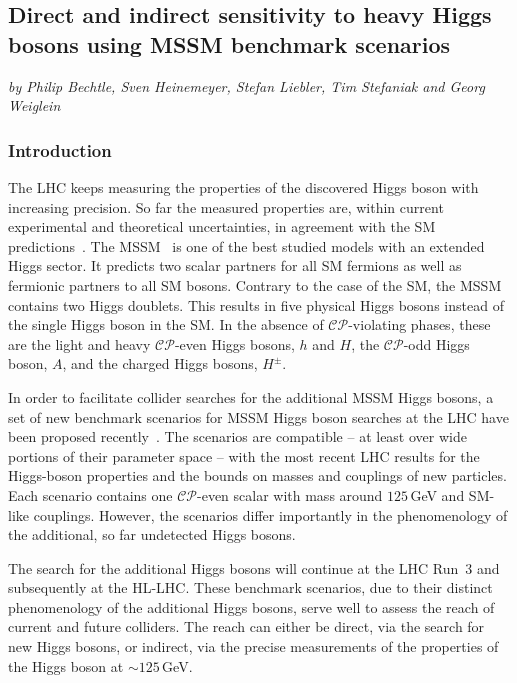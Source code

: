 \subsection{Direct and indirect sensitivity to heavy Higgs bosons using MSSM benchmark scenarios}\label{Sec:9.5}
\begin{center}
\textit{by Philip Bechtle, Sven Heinemeyer, Stefan Liebler, Tim Stefaniak and Georg Weiglein}
\end{center}

\subsubsection{Introduction}

The LHC keeps measuring the properties of the discovered Higgs boson with increasing precision. So far the measured properties are, within current experimental and theoretical uncertainties, in agreement with the SM predictions~\cite{Khachatryan:2016vau}. The MSSM~\cite{Nilles:1983ge,Haber:1984rc,Gunion:1984yn} is one of the best studied models with an extended Higgs sector. It predicts two scalar partners for all SM fermions as well as fermionic partners to all SM bosons. Contrary to the case of the SM, the MSSM contains two Higgs doublets.
This results in five physical Higgs bosons instead of the single Higgs boson in the SM. In the absence of $\mathcal{CP}$-violating phases, these are the light and heavy $\mathcal{CP}$-even Higgs bosons,  
$h$ and $H$, the $\mathcal{CP}$-odd Higgs boson, $A$, and the charged Higgs bosons, $H^\pm$.

In order to facilitate collider searches for the additional MSSM Higgs bosons, a set of new benchmark scenarios for MSSM Higgs boson searches at the LHC have been proposed recently~\cite{Bahl:2018zmf}. The scenarios are compatible -- at least over wide portions
of their parameter space -- with the most recent LHC results for the
Higgs-boson properties and the bounds on masses and couplings of new
particles. Each scenario contains one $\mathcal{CP}$-even scalar with mass around $125$\,GeV and SM-like couplings. However, the scenarios differ importantly in the phenomenology of the additional, so far undetected Higgs bosons.

The search for the additional Higgs bosons will continue at the LHC
Run~3 and subsequently at the HL-LHC. These benchmark scenarios, due to their distinct phenomenology of the additional Higgs bosons, serve well to assess the reach of current and future colliders. The reach can either be direct, via the search for new Higgs bosons, or indirect, via the precise measurements of the properties of the Higgs boson at $\sim 125$\,GeV. 

